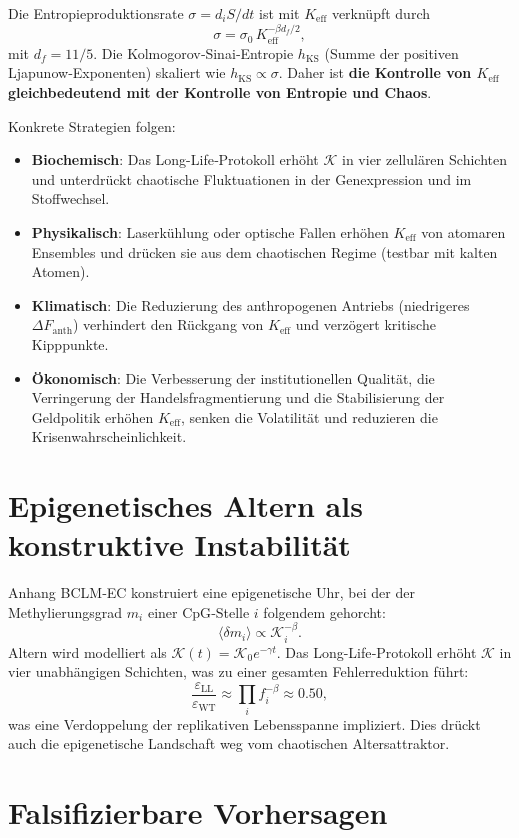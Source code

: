 \documentclass[12pt,a4paper]{article}
\newcommand{\Keff}{K_{\mathrm{eff}}}
\newcommand{\REL}{\mathcal{K}}
\begin{document}
	Die Entropieproduktionsrate $\sigma = d_iS/dt$ ist mit $\Keff$ verknüpft durch
	\[
	\sigma = \sigma_0\, \Keff^{-\beta d_f/2},
	\]
	mit $d_f = 11/5$. Die Kolmogorov‑Sinai‑Entropie $h_{\mathrm{KS}}$ (Summe der positiven
	Ljapunow‑Exponenten) skaliert wie $h_{\mathrm{KS}} \propto \sigma$. Daher ist
	\textbf{die Kontrolle von $\Keff$ gleichbedeutend mit der Kontrolle von Entropie und Chaos}.
	
	Konkrete Strategien folgen:
	\begin{itemize}
		\item \textbf{Biochemisch}: Das Long-Life‑Protokoll erhöht $\REL$ in vier zellulären Schichten
		und unterdrückt chaotische Fluktuationen in der Genexpression und im Stoffwechsel.
		\item \textbf{Physikalisch}: Laserkühlung oder optische Fallen erhöhen $\Keff$ von atomaren
		Ensembles und drücken sie aus dem chaotischen Regime (testbar mit kalten Atomen).
		\item \textbf{Klimatisch}: Die Reduzierung des anthropogenen Antriebs (niedrigeres $\Delta F_{\mathrm{anth}}$)
		verhindert den Rückgang von $\Keff$ und verzögert kritische Kipppunkte.
		\item \textbf{Ökonomisch}: Die Verbesserung der institutionellen Qualität, die Verringerung der
		Handelsfragmentierung und die Stabilisierung der Geldpolitik erhöhen $\Keff$, senken die Volatilität
		und reduzieren die Krisenwahrscheinlichkeit.
	\end{itemize}
	
	\section{Epigenetisches Altern als konstruktive Instabilität}
	
	Anhang BCLM‑EC konstruiert eine epigenetische Uhr, bei der der Methylierungsgrad $m_i$
	einer CpG‑Stelle $i$ folgendem gehorcht:
	\[
	\langle \delta m_i \rangle \propto \REL_i^{-\beta}.
	\]
	Altern wird modelliert als $\REL(t) = \REL_0 e^{-\gamma t}$. Das Long-Life‑Protokoll
	erhöht $\REL$ in vier unabhängigen Schichten, was zu einer gesamten Fehlerreduktion führt:
	\[
	\frac{\varepsilon_{\mathrm{LL}}}{\varepsilon_{\mathrm{WT}}} \approx \prod_i f_i^{-\beta}
	\approx 0.50,
	\]
	was eine Verdoppelung der replikativen Lebensspanne impliziert. Dies drückt auch die
	epigenetische Landschaft weg vom chaotischen Altersattraktor.
	
	\section{Falsifizierbare Vorhersagen}
	
\end{document}
